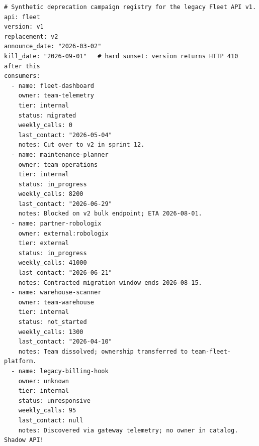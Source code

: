 \begin{verbatim}
# Synthetic deprecation campaign registry for the legacy Fleet API v1.
api: fleet
version: v1
replacement: v2
announce_date: "2026-03-02"
kill_date: "2026-09-01"   # hard sunset: version returns HTTP 410 after this
consumers:
  - name: fleet-dashboard
    owner: team-telemetry
    tier: internal
    status: migrated
    weekly_calls: 0
    last_contact: "2026-05-04"
    notes: Cut over to v2 in sprint 12.
  - name: maintenance-planner
    owner: team-operations
    tier: internal
    status: in_progress
    weekly_calls: 8200
    last_contact: "2026-06-29"
    notes: Blocked on v2 bulk endpoint; ETA 2026-08-01.
  - name: partner-robologix
    owner: external:robologix
    tier: external
    status: in_progress
    weekly_calls: 41000
    last_contact: "2026-06-21"
    notes: Contracted migration window ends 2026-08-15.
  - name: warehouse-scanner
    owner: team-warehouse
    tier: internal
    status: not_started
    weekly_calls: 1300
    last_contact: "2026-04-10"
    notes: Team dissolved; ownership transferred to team-fleet-platform.
  - name: legacy-billing-hook
    owner: unknown
    tier: internal
    status: unresponsive
    weekly_calls: 95
    last_contact: null
    notes: Discovered via gateway telemetry; no owner in catalog. Shadow API!
\end{verbatim}

